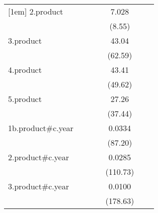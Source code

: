 {\begin{tabular}{l*{6}{c}}
[1em]
2.product           &                     &                     &                     &       7.028\sym{***}&                     &                     \\
                    &                     &                     &                     &      (8.55)         &                     &                     \\
[1em]
3.product           &                     &                     &                     &       43.04\sym{***}&                     &                     \\
                    &                     &                     &                     &     (62.59)         &                     &                     \\
[1em]
4.product           &                     &                     &                     &       43.41\sym{***}&                     &                     \\
                    &                     &                     &                     &     (49.62)         &                     &                     \\
[1em]
5.product           &                     &                     &                     &       27.26\sym{***}&                     &                     \\
                    &                     &                     &                     &     (37.44)         &                     &                     \\
[1em]
1b.product#c.year   &                     &                     &                     &      0.0334\sym{***}&                     &                     \\
                    &                     &                     &                     &     (87.20)         &                     &                     \\
[1em]
2.product#c.year    &                     &                     &                     &      0.0285\sym{***}&                     &                     \\
                    &                     &                     &                     &    (110.73)         &                     &                     \\
[1em]
3.product#c.year    &                     &                     &                     &      0.0100\sym{***}&                     &                     \\
                    &                     &                     &                     &    (178.63)         &                     &                     \\

\end{tabular}}
